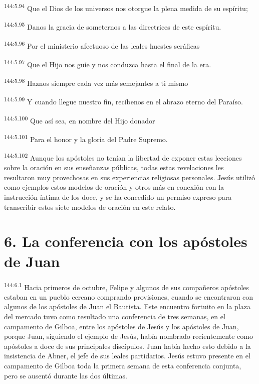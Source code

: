 \begin{center}
\par 
\textsuperscript{144:5.94} Que el Dios de los universos nos otorgue la plena medida de su espíritu;

\par 
\textsuperscript{144:5.95} Danos la gracia de someternos a las directrices de este espíritu.

\par 
\textsuperscript{144:5.96} Por el ministerio afectuoso de las leales huestes seráficas

\par 
\textsuperscript{144:5.97} Que el Hijo nos guíe y nos conduzca hasta el final de la era.

\par 
\textsuperscript{144:5.98} Haznos siempre cada vez más semejantes a ti mismo

\par 
\textsuperscript{144:5.99} Y cuando llegue nuestro fin, recíbenos en el abrazo eterno del Paraíso.

\par 
\textsuperscript{144:5.100} Que así sea, en nombre del Hijo donador

\par 
\textsuperscript{144:5.101} Para el honor y la gloria del Padre Supremo.
\end{center}

\par 
\textsuperscript{144:5.102} Aunque los apóstoles no tenían la libertad de exponer estas lecciones sobre la oración en sus enseñanzas públicas, todas estas revelaciones les resultaron muy provechosas en sus experiencias religiosas personales. Jesús utilizó como ejemplos estos modelos de oración y otros más en conexión con la instrucción íntima de los doce, y se ha concedido un permiso expreso para transcribir estos siete modelos de oración en este relato.

\section*{6. La conferencia con los apóstoles de Juan}
\par 
\textsuperscript{144:6.1} Hacia primeros de octubre, Felipe y algunos de sus compañeros apóstoles estaban en un pueblo cercano comprando provisiones, cuando se encontraron con algunos de los apóstoles de Juan el Bautista. Este encuentro fortuito en la plaza del mercado tuvo como resultado una conferencia de tres semanas, en el campamento de Gilboa, entre los apóstoles de Jesús y los apóstoles de Juan, porque Juan, siguiendo el ejemplo de Jesús, había nombrado recientemente como apóstoles a doce de sus principales discípulos. Juan había hecho esto debido a la insistencia de Abner, el jefe de sus leales partidarios. Jesús estuvo presente en el campamento de Gilboa toda la primera semana de esta conferencia conjunta, pero se ausentó durante las dos últimas.

